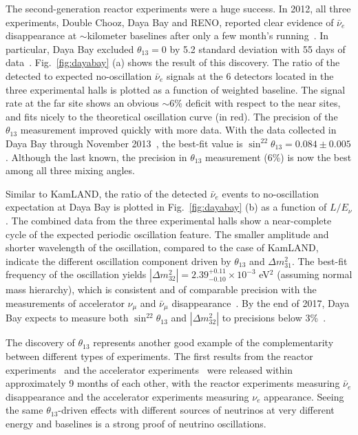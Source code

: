 \documentclass[aps,twocolumn,preprintnumbers,amsmath,superscriptaddress,amssymb,floats,nofootinbib]{revtex4-1}
\begin{document}
The second-generation reactor experiments were a huge success. 
In 2012, all three experiments, Double Chooz, Daya Bay and RENO, reported 
clear evidence of $\bar\nu_{e}$ disappearance at $\sim$kilometer baselines after only a few month's running~\cite{DChooz,Reno,Dayabay}. 
In particular, Daya Bay excluded $\theta_{13}=0$ by 5.2 standard deviation with 55 days of data~\cite{Dayabay}. Fig.~\ref{fig:dayabay} (a) shows the result of this discovery. The ratio of the detected to expected no-oscillation $\bar\nu_{e}$ signals at the 6 detectors located in the three experimental halls is plotted as a function of weighted baseline. The signal rate at the far site shows an obvious
$\sim$6\% deficit with respect to the near sites, and fits nicely to the theoretical oscillation curve (in red). The precision of the $\theta_{13}$ measurement improved quickly with more data. With the data collected in Daya Bay through November 2013~\cite{Zhang-Neutrino14}, the best-fit value is $\sin^22\theta_{13} = 0.084 \pm 0.005$. 
Although the last known, the precision in $\theta_{13}$ measurement (6\%) is now the best among all three mixing angles.

Similar to KamLAND, the ratio of the detected $\bar\nu_{e}$ events to no-oscillation expectation at Daya Bay is plotted in Fig.~\ref{fig:dayabay} (b) as a function of $L/E_{\nu}$. 
The combined data from the three experimental halls show a near-complete cycle of the expected periodic oscillation feature. 
The smaller amplitude and shorter wavelength of the oscillation, compared to the case of KamLAND, indicate the different oscillation component driven by $\theta_{13}$ and $\Delta{m}^2_{31}$. 
The best-fit frequency of the oscillation yields $|\Delta{m}^2_{32}| = 2.39^{+0.11}_{-0.10} \times 10^{-3}$ eV$^2$ (assuming normal mass hierarchy), which is consistent and of comparable precision with the measurements of accelerator $\nu_\mu$ and $\bar\nu_\mu$ disappearance~\cite{MINOS2014,T2K2014}. 
By the end of 2017, Daya Bay expects to measure both $\sin^22\theta_{13}$ and $|\Delta{m}^2_{32}|$ to precisions below 3\%~\cite{Zhang-Neutrino14}.

The discovery of $\theta_{13}$ represents another good example of the complementarity between different types of experiments. The first results from the reactor experiments~\cite{DChooz,Dayabay,Reno} and the accelerator experiments~\cite{T2K2011,MINOS2011} were released within approximately 9 months of each other, with the reactor experiments measuring $\bar\nu_e$ disappearance and the accelerator experiments measuring $\nu_e$ appearance. Seeing the same $\theta_{13}$-driven effects with different sources 
of neutrinos at very different energy and baselines is a strong proof of neutrino oscillations.
\end{document}
